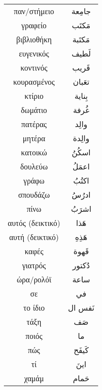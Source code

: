 \documentclass[twocolumn,a4paper]{article}
\newcommand{\ar}[1]{\textarabic{#1}}
\begin{document}
\begin{supertabular}{ c c }
παν/στήμειο & \ar{ جامِعة } \\
γραφείο     & \ar{ مَكتَب } \\
βιβλιοθήκη  & \ar{ مَكتَبة } \\
ευγενικός   & \ar{ لَطيف } \\
κοντινός    & \ar{ قَريب } \\
κουρασμένος & \ar{ تعَبان } \\
κτίριο      & \ar{ بِناية } \\
δωμάτιο     & \ar{ غُرفة } \\
πατέρας     & \ar{ والِد} \\
μητέρα      & \ar{ والِدة } \\
κατοικώ     & \ar{ اسكُنُ } \\
δουλεύω     & \ar{ اعمَلُ } \\
γράφω       & \ar{ اكتُبُ } \\
σπουδάζω    & \ar{ ادرُسُ } \\
πίνω        & \ar{ اشرَبُ } \\
αυτός (δεικτικό) & \ar{ هَذا } \\
αυτή (δεικτικό)  & \ar{ هَذِهِ } \\
καφές       & \ar{ قَهوة } \\
γιατρός     & \ar{ دُكتور } \\
ώρα/ρολόϊ   & \ar{ ساعة} \\
σε          & \ar{ في } \\
το ίδιο     & \ar{ نَفس ال } \\
τάξη        & \ar{ صَف } \\
ποιός       & \ar{ ما } \\
πώς         & \ar{ كَيفَح } \\
τί          & \ar{ اينَ } \\
χαμάμ       & \ar{ حَمام } \\

\end{supertabular}


\clearpage
\end{document}

